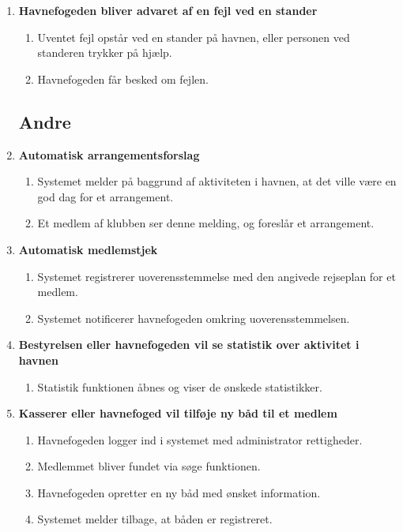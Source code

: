 \begin{enumerate}
    \item{\bf{Havnefogeden bliver advaret af en fejl ved en stander}}
      \begin{enumerate}
        \item Uventet fejl opstår ved en stander på havnen, eller personen ved standeren trykker på hjælp.
        \item Havnefogeden får besked om fejlen.
      \end{enumerate}

\subsection{Andre}

    \item{\bf{Automatisk arrangementsforslag}}
      \begin{enumerate}
        \item Systemet melder på baggrund af aktiviteten i havnen, at det ville være en god dag for et arrangement.
        \item Et medlem af klubben ser denne melding, og foreslår et arrangement.
      \end{enumerate}

    \item{\bf{Automatisk medlemstjek}}
      \begin{enumerate}
        \item Systemet registrerer uoverensstemmelse med den angivede rejseplan for et medlem.
        \item Systemet notificerer havnefogeden omkring uoverensstemmelsen.
      \end{enumerate}

    \item{\bf{Bestyrelsen eller havnefogeden vil se statistik over aktivitet i havnen}}
      \begin{enumerate}
        \item Statistik funktionen åbnes og viser de ønskede statistikker.
      \end{enumerate}
	  
	\item{\bf{Kasserer eller havnefoged vil tilføje ny båd til et medlem}}
	  \begin{enumerate}
		\item Havnefogeden logger ind i systemet med administrator rettigheder.
		\item Medlemmet bliver fundet via søge funktionen.
		\item Havnefogeden opretter en ny båd med ønsket information.
		\item Systemet melder tilbage, at båden er registreret.
	   \end{enumerate}
\end{enumerate}
